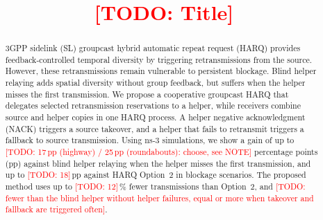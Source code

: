 \documentclass[conference]{IEEEtran}
\newcommand{\todo}[1]{\textcolor{red}{[TODO: #1]}}
\begin{document}
\title{\todo{Title}\\
}

\author{
\IEEEauthorblockN{\todo{Author 1}, \todo{Author 2}}
\IEEEauthorblockA{\todo{Affiliation, city, country}\\
\todo{email}}
}

\maketitle

\begin{abstract}
3GPP sidelink (SL) groupcast hybrid automatic repeat request (HARQ) provides feedback-controlled
temporal diversity by triggering retransmissions from the source. However, these retransmissions remain
vulnerable to persistent blockage. Blind helper relaying adds spatial diversity without group feedback,
but suffers when the helper misses the first transmission. We propose a cooperative groupcast HARQ that
delegates selected retransmission reservations to a helper, while receivers combine source and helper
copies in one HARQ process. A helper negative acknowledgment (NACK) triggers a source takeover, and a
helper that fails to retransmit triggers a fallback to source transmission. Using ns-3 simulations, we
show a gain of up to \todo{17\,pp (highway) / 25\,pp (roundabouts): choose, see NOTE} percentage
points (pp) against blind helper relaying when the helper misses the first transmission, and up to
\todo{18}\,pp against HARQ Option~2 in blockage scenarios. The proposed method uses up to \todo{12}\,\% fewer transmissions than Option~2, and
\todo{fewer than the blind helper without helper failures, equal or more when takeover and fallback
are triggered often}.
\end{abstract}
\end{document}
